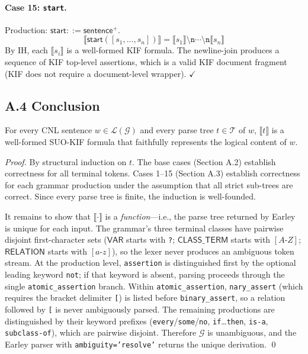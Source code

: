 \paragraph{Case 15: \texttt{start}.}
Production: $\mathsf{start} ::= \mathsf{sentence}^{+}$.
\begin{equation*}
  \llbracket \mathsf{start}([s_1, \dots, s_n]) \rrbracket
    = \llbracket s_1 \rrbracket \texttt{\textbackslash n} \cdots \texttt{\textbackslash n} \llbracket s_n \rrbracket
\end{equation*}
By IH, each $\llbracket s_i \rrbracket$ is a well-formed KIF formula.
The newline-join produces a sequence of KIF top-level assertions, which is a valid
KIF document fragment (KIF does not require a document-level wrapper). \hfill$\checkmark$

\subsection*{A.4 Conclusion}

\begin{theorem}
For every CNL sentence $w \in \mathcal{L}(\mathcal{G})$ and every parse tree
$t \in \mathcal{T}$ of $w$, $\llbracket t \rrbracket$ is a well-formed SUO-KIF formula
that faithfully represents the logical content of $w$.
\end{theorem}

\begin{proof}
By structural induction on $t$. The base cases (Section A.2) establish correctness
for all terminal tokens. Cases 1--15 (Section A.3) establish correctness for each
grammar production under the assumption that all strict sub-trees are correct.
Since every parse tree is finite, the induction is well-founded.

It remains to show that $\llbracket \cdot \rrbracket$ is a \emph{function}---i.e.,
the parse tree returned by Earley is unique for each input. The grammar's three
terminal classes have pairwise disjoint first-character sets
($\mathsf{VAR}$ starts with \texttt{?};
$\mathsf{CLASS\_TERM}$ starts with $[A\text{-}Z]$;
$\mathsf{RELATION}$ starts with $[a\text{-}z]$),
so the lexer never produces an ambiguous token stream. At the production level,
\texttt{assertion} is distinguished first by the optional leading keyword
\texttt{not}; if that keyword is absent, parsing proceeds through the single
\texttt{atomic\_assertion} branch. Within \texttt{atomic\_assertion},
\texttt{nary\_assert} (which requires the bracket delimiter \texttt{[}) is listed
before \texttt{binary\_assert}, so a relation followed by \texttt{[} is never
ambiguously parsed. The remaining productions are distinguished by their keyword
prefixes (\texttt{every}/\texttt{some}/\texttt{no}, \texttt{if}\ldots\texttt{then},
\texttt{is-a}, \texttt{subclass-of}), which are pairwise disjoint. Therefore
$\mathcal{G}$ is unambiguous, and the Earley parser with
\texttt{ambiguity='resolve'} returns the unique derivation. \qed
\end{proof}

